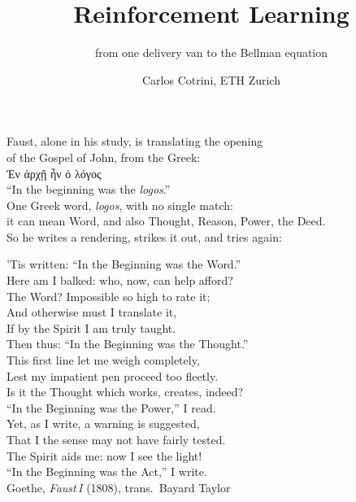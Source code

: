 \documentclass[aspectratio=169]{beamer}
\title{Reinforcement Learning}
\subtitle{from one delivery van to the Bellman equation}
\author{Carlos Cotrini, ETH Zurich}
\date{}
\begin{document}
\begin{frame}[plain]
  \titlepage
\end{frame}


\begin{frame}[plain]
  \vfill
  \centering
  {\normalsize Faust, alone in his study, is translating the opening\\ of the Gospel of John, from the Greek:}\\[14pt]
  {\Large Ἐν ἀρχῇ ἦν ὁ λόγος}\\[4pt]
  {\color{muted}``In the beginning was the \emph{logos}.''}\\[16pt]
  {\normalsize One Greek word, \emph{logos}, with no single match:\\ it can mean \alert{Word}, and also \alert{Thought}, Reason, Power, the \alert{Deed}.}\\[12pt]
  {\normalsize So he writes a rendering, strikes it out, and tries again:}
  \vfill
\end{frame}

\begin{frame}[plain]
  \vfill
  \centering
  \small
  'Tis written: ``In the Beginning was the \alert{Word}.''\\
  Here am I balked: who, now, can help afford?\\
  The Word? Impossible so high to rate it;\\
  And otherwise must I translate it,\\
  If by the Spirit I am truly taught.\\
  Then thus: ``In the Beginning was the \alert{Thought}.''\\
  This first line let me weigh completely,\\
  Lest my impatient pen proceed too fleetly.\\
  Is it the Thought which works, creates, indeed?\\
  ``In the Beginning was the Power,'' I read.\\
  Yet, as I write, a warning is suggested,\\
  That I the sense may not have fairly tested.\\
  The Spirit aids me: now I see the light!\\
  ``In the Beginning was the \alert{Act},'' I write.\\[10pt]
  {\footnotesize\color{muted}Goethe, \emph{Faust\,I} (1808), trans.\ Bayard Taylor}
  \vfill
\end{frame}
\end{document}
